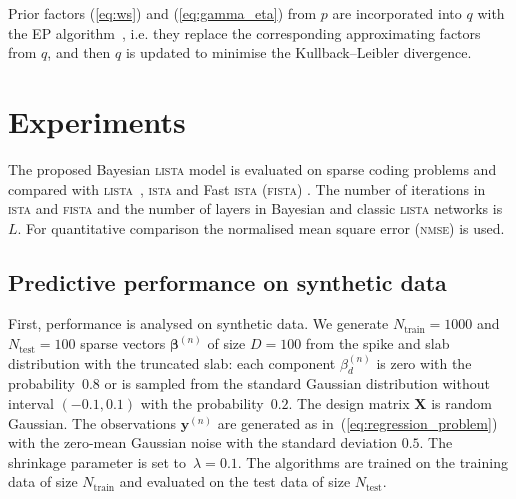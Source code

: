 \documentclass{article}
\begin{document}
  Prior factors (\ref{eq:ws}) and (\ref{eq:gamma_eta}) from $p$ are incorporated into $q$ with the EP algorithm~\cite{hernandez2015probabilistic}, i.e. they replace the corresponding approximating factors from $q$, and then $q$ is updated to minimise the Kullback–Leibler divergence.
  
  \section{Experiments}
  \label{sec:experiments}
  The proposed Bayesian \textsc{lista} model is evaluated on sparse coding problems and compared with \textsc{lista}~\cite{gregor2010learning}, \textsc{ista} \cite{daubechies2004iterative} and Fast \textsc{ista} (\textsc{fista}) \cite{beck2009fast}. The number of iterations in \textsc{ista} and \textsc{fista}  and the number of layers in Bayesian and classic \textsc{lista} networks is $L$. For quantitative comparison the normalised mean square error (\textsc{nmse}) is used. %
  
  \subsection{Predictive performance on synthetic data}
  First, performance is analysed on synthetic data. We generate $N_\text{train}=1000$ and $N_{\text{test}} = 100$ sparse vectors $\boldsymbol\beta^{(n)}$ of size $D = 100$  from the spike and slab distribution with the truncated slab: each component $\beta^{(n)}_{d}$ is zero with the probability~$0.8$ or is sampled from the standard Gaussian distribution without interval $(-0.1, 0.1)$ with the probability~$0.2$. The design matrix $\mathbf{X}$ is random Gaussian.  The observations $\mathbf{y}^{(n)}$ are generated as in~(\ref{eq:regression_problem}) with the zero-mean Gaussian noise with the standard deviation $0.5$. The shrinkage parameter is set to~$\lambda = 0.1$. The algorithms are trained on the training data of size $N_\text{train}$ and evaluated on the test data of size $N_{\text{test}}$.
  
\end{document}
